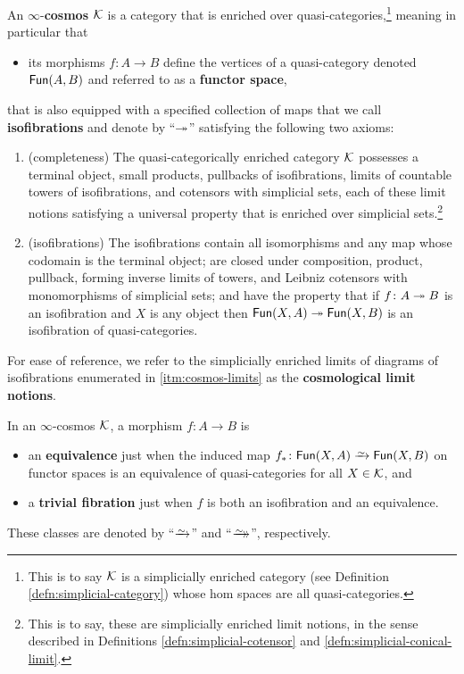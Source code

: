 \begin{defn}\label{defn:cosmos} An $\infty$-\textbf{cosmos} ${\mathord{\mathcal{K}}}$ is a category that is enriched over quasi-categories,\footnote{This is to say ${\mathord{\mathcal{K}}}$ is a simplicially enriched category (see Definition \ref{defn:simplicial-category}) whose hom spaces are all quasi-categories.} meaning in particular that\begin{itemize}
  \item its morphisms $f \colon A \to B$ define the vertices of a quasi-category denoted ${\mathord{\mathsf{Fun}}}(A,B)$ and referred to as a \textbf{functor space},
  \end{itemize}
  that is also equipped with a specified collection of maps that we call \textbf{isofibrations} and denote by ``$\twoheadrightarrow$'' satisfying the following two axioms:
  \begin{enumerate}
  \item\label{itm:cosmos-limits} (completeness) The quasi-categorically enriched category ${\mathord{\mathcal{K}}}$ pos\-sess\-es a terminal object, small products, pullbacks of isofibrations, limits of countable towers of isofibrations, and cotensors with simplicial sets, each of these limit notions satisfying a universal property that is enriched over simplicial sets.\footnote{This is to say, these are simplicially enriched limit notions, in the sense described in Definitions \ref{defn:simplicial-cotensor} and \ref{defn:simplicial-conical-limit}.}
  \item\label{itm:cosmos-isofib} (isofibrations) The isofibrations contain all isomorphisms and any map whose codomain is the terminal object; are closed under composition, product, pullback, forming inverse limits of towers, and Leibniz cotensors with monomorphisms of simplicial sets; and have the property that if $f \colon A \twoheadrightarrow B$ is an isofibration and $X$ is any object then ${\mathord{\mathsf{Fun}}}(X,A) \twoheadrightarrow {\mathord{\mathsf{Fun}}}(X,B)$ is an isofibration of quasi-categories.
  \end{enumerate}
\end{defn}

For ease of reference, we refer to the simplicially enriched limits of diagrams of isofibrations enumerated in \ref{itm:cosmos-limits} as the \textbf{cosmological limit notions}.

\begin{defn}\label{defn:cosmos-classes} In an $\infty$-cosmos ${\mathord{\mathcal{K}}}$, a morphism $f\colon A \to B$ is
\begin{itemize}
\item an \textbf{equivalence} just when the induced map $f_* \colon\Fun(X,A) \we \Fun(X,B)$ on functor spaces  is an equivalence of quasi-categories for all $X \in {\mathord{\mathcal{K}}}$, and
\item a \textbf{trivial fibration} just when $f$ is both an isofibration and an equivalence.
\end{itemize}
These classes are denoted by ``$\we$''  and ``$\trvfib$'', respectively.
\end{defn}

